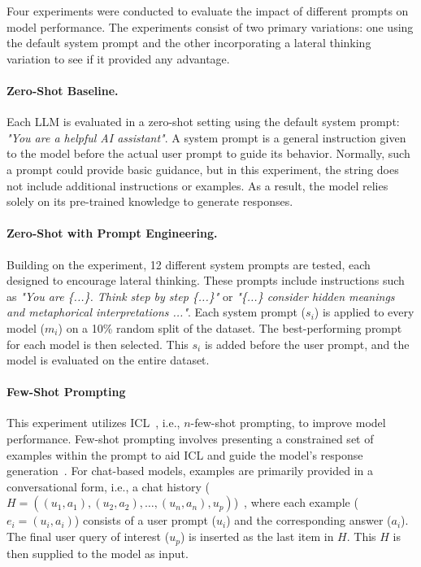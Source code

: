 Four experiments were conducted to evaluate the impact of different prompts on model performance. The experiments consist of two primary variations: one using the default system prompt and the other incorporating a lateral thinking variation to see if it provided any advantage.

\paragraph{Zero-Shot Baseline.}
\label{sec:zero-shot-prompt}

Each \ac{LLM} is evaluated in a zero-shot setting using the default system prompt: \textit{"You are a helpful AI assistant"}. A system prompt is a general instruction given to the model before the actual user prompt to guide its behavior. Normally, such a prompt could provide basic guidance, but in this experiment, the string does not include additional instructions or examples. As a result, the model relies solely on its pre-trained knowledge to generate responses.

\paragraph{Zero-Shot with Prompt Engineering.}
\label{sec:zero-shot-prompt-engineering}

Building on the  experiment, 12 different system prompts are tested, each designed to encourage lateral thinking. These prompts include instructions such as \textit{"You are \{...\}. Think step by step \{...\}"} or \textit{"\{...\} consider hidden meanings and metaphorical interpretations {...}"}. Each system prompt ($s_i$) is applied to every model ($m_i$) on a 10\% random split of the dataset. The best-performing prompt for each model is then selected. This $s_i$ is added before the user prompt, and the model is evaluated on the entire dataset.

\paragraph{Few-Shot Prompting}
\label{sec:few-shot-prompt}

This experiment utilizes \acf{ICL}~\cite{brownLanguageModelsAre2020}, i.e., $n$-few-shot prompting, to improve model performance. Few-shot prompting involves presenting a constrained set of examples within the prompt to aid \acl{ICL} and guide the model's response generation~\cite{brownLanguageModelsAre2020}. For chat-based models, examples are primarily provided in a conversational form, i.e., a chat history ($H = ((u_1, a_1), (u_2, a_2), \ldots, (u_n, a_n), u_p)$)~\cite{HowUseFew}, where each example ($e_i = (u_i, a_i)$) consists of a user prompt ($u_i$) and the corresponding answer ($a_i$). The final user query of interest ($u_p$) is inserted as the last item in $H$. This $H$ is then supplied to the model as input.

